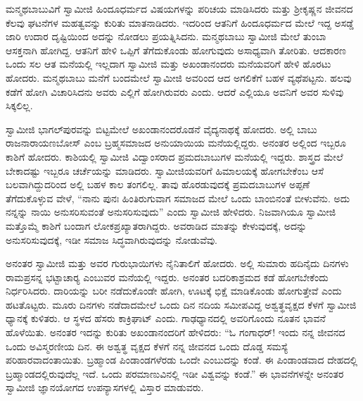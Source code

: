 ಮನ್ಮಥಬಾಬುವಿಗೆ ಸ್ವಾಮೀಜಿ ಹಿಂದೂಧರ್ಮದ ವಿಷಯಗಳನ್ನು ಪರಿಚಯ ಮಾಡಿಸಿದರು ಮತ್ತು ಶ‍್ರೀಕೃಷ್ಣನ ಜೀವನದ ಕೆಲವು ಘಟನೆಗಳ ಮಹತ್ವವನ್ನು ಕುರಿತು ಮಾತನಾಡಿದರು. ಇದರಿಂದ ಆತನಿಗೆ ಹಿಂದೂಧರ್ಮದ ಮೇಲೆ ಇದ್ದ ಅಸಡ್ಡೆ ಜಾರಿ ಉದಾರ ದೃಷ್ಟಿಯಿಂದ ಅದನ್ನು ನೋಡಲು ಪ್ರಯತ್ನಿಸಿದನು. ಮನ್ಮಥಬಾಬು ಸ್ವಾಮೀಜಿ ಮೇಲೆ ತುಂಬಾ ಆಸಕ್ತನಾಗಿ ಹೋಗಿದ್ದ. ಆತನಿಗೆ ಹೇಳಿ ಒಪ್ಪಿಗೆ ತೆಗೆದುಕೊಂಡು ಹೋಗುವುದು ಅಸಾಧ್ಯವಾಗಿ ತೋರಿತು. ಆದಕಾರಣ ಒಂದು ಸಲ ಆತ ಮನೆಯಲ್ಲಿ ಇಲ್ಲದಾಗ ಸ್ವಾಮೀಜಿ ಮತ್ತು ಅಖಂಡಾನಂದರು ಮನೆಯವರಿಗೆ ಹೇಳಿ ಹೊರಟು ಹೋದರು. ಮನ್ಮಥಬಾಬು ಮನೆಗೆ ಬಂದಮೇಲೆ ಸ್ವಾಮೀಜಿ ಅವರಿಂದ ಆದ ಅಗಲಿಕೆಗೆ ಬಹಳ ವ್ಯಥೆಪಟ್ಟನು. ಹಲವು ಕಡೆಗೆ ಹೋಗಿ ವಿಚಾರಿಸಿದನು ಅವರು ಎಲ್ಲಿಗೆ ಹೋಗಿರುವರು ಎಂದು. ಆದರೆ ಎಲ್ಲಿಯೂ ಅವನಿಗೆ ಅವರ ಸುಳಿವು ಸಿಕ್ಕಲಿಲ್ಲ. 

 ಸ್ವಾಮೀಜಿ ಭಾಗಲ್‍ಪುರವನ್ನು ಬಿಟ್ಟಮೇಲೆ ಅಖಂಡಾನಂದರೊಡನೆ ವೈದ್ಯನಾಥಕ್ಕೆ ಹೋದರು. ಅಲ್ಲಿ ಬಾಬು ರಾಜನಾರಾಯಣಬೋಸ್ ಎಂಬ ಬ್ರಹ್ಮಸಮಾಜದ ಅನುಯಾಯಿಯ ಮನೆಯಲ್ಲಿದ್ದರು. ಅನಂತರ ಅಲ್ಲಿಂದ ಇಬ್ಬರೂ ಕಾಶಿಗೆ ಹೋದರು. ಕಾಶಿಯಲ್ಲಿ ಸ್ವಾಮೀಜಿ ವಿದ್ವಾಂಸರಾದ ಪ್ರಮದಬಾಬುಗಳ ಮನೆಯಲ್ಲಿ ಇದ್ದರು. ಶಾಸ್ತ್ರದ ಮೇಲೆ ಬೇಕಾದಷ್ಟು ಇಬ್ಬರೂ ಚರ್ಚೆಯನ್ನು ಮಾಡಿದರು. ಸ್ವಾಮೀಜಿಯವರಿಗೆ ಹಿಮಾಲಯಕ್ಕೆ ಹೋಗಬೇಕೆಂಬ ಆಸೆ ಬಲವಾಗಿದ್ದುದರಿಂದ ಅಲ್ಲಿ ಬಹಳ ಕಾಲ ತಂಗಲಿಲ್ಲ. ತಾವು ಹೊರಡುವುದಕ್ಕೆ ಪ್ರಮದಬಾಬುಗಳ ಅಪ್ಪಣೆ ತೆಗೆದುಕೊಳ್ಳುವ ವೇಳೆ, “ನಾನು ಪುನಃ ಹಿಂತಿರುಗುವಾಗ ಸಮಾಜದ ಮೇಲೆ ಒಂದು ಬಾಂಬಿನಂತೆ ಬೀಳುವೆನು. ಅದು ನನ್ನನ್ನು ನಾಯಿ ಅನುಸರಿಸುವಂತೆ ಅನುಸರಿಸುವುದು” ಎಂದು ಸ್ವಾಮೀಜಿ ಹೇಳಿದರು. ನಿಜವಾಗಿಯೂ ಸ್ವಾಮೀಜಿ ಮತ್ತೊಮ್ಮೆ ಕಾಶಿಗೆ ಬಂದಾಗ ಲೋಕಪ್ರಖ್ಯಾತರಾಗಿದ್ದರು. ಅವರಾಡಿದ ಮಾತನ್ನು ಕೇಳುವುದಕ್ಕೆ, ಅದನ್ನು ಅನುಸರಿಸುವುದಕ್ಕೆ, ಇಡೀ ಸಮಾಜ ಸಿದ್ಧವಾಗಿರುವುದನ್ನು ನೋಡುವೆವು. 

ಅನಂತರ ಸ್ವಾಮೀಜಿ ಮತ್ತು ಅವರ ಗುರುಭಾಯಿಗಳು ನೈನಿತಾಲಿಗೆ ಹೋದರು. ಅಲ್ಲಿ ಸುಮಾರು ಹದಿನೈದು ದಿನಗಳು ರಾಮಪ್ರಸನ್ನ ಭಟ್ಟಾಚಾರ‍್ಯ ಎಂಬುವರ ಮನೆಯಲ್ಲಿ ಇದ್ದರು. ಅನಂತರ ಬದರಿಕಾಶ್ರಮದ ಕಡೆ ಹೋಗಬೇಕೆಂದು ನಿರ್ಧರಿಸಿದರು. ದಾರಿಯನ್ನು ಬರೀ ನಡೆದುಕೊಂಡೇ ಹೋಗಿ, ಊಟಕ್ಕೆ ಭಿಕ್ಷೆ ಮಾಡಿಕೊಂಡು ಹೋಗುತ್ತೇವೆ ಎಂದು ಹಟತೊಟ್ಟರು. ಮೂರು ದಿನಗಳು ನಡೆದಾದಮೇಲೆ ಒಂದು ದಿನ ನದಿಯ ಸಮೀಪವಿದ್ದ ಅಶ್ವತ್ಥವೃಕ್ಷದ ಕೆಳಗೆ ಸ್ವಾಮೀಜಿ ಧ್ಯಾನಕ್ಕೆ ಕುಳಿತರು. ಆ ಸ್ಥಳದ ಹೆಸರು ಕಾಕ್ರಿಘಾಟ್ ಎಂದು. ಗಾಢಧ್ಯಾನದಲ್ಲಿ ಅವರಿಗೊಂದು ನೂತನ ಭಾವನೆ ಹೊಳೆಯಿತು. ಅನಂತರ ಇದನ್ನು ಕುರಿತು ಅಖಂಡಾನಂದರಿಗೆ ಹೇಳಿದರು: “ಓ ಗಂಗಾಧರ್! ಇಂದು ನನ್ನ ಜೀವನದ ಒಂದು ಅವಿಸ್ಮರಣೀಯ ದಿನ. ಈ ಅಶ್ವತ್ಥ ವೃಕ್ಷದ ಕೆಳಗೆ ನನ್ನ ಜೀವನದ ಒಂದು ದೊಡ್ಡ ಸಮಸ್ಯೆ ಪರಿಹಾರವಾದಂತಾಯಿತು. ಬ್ರಹ್ಮಾಂಡ ಪಿಂಡಾಂಡಗಳೆರಡು ಒಂದೇ ಎಂಬುದನ್ನು ಕಂಡೆ. ಈ ಪಿಂಡಾಂಡವಾದ ದೇಹದಲ್ಲಿ ಬ್ರಹ್ಮಾಂಡದಲ್ಲಿರುವುದೆಲ್ಲ ಇದೆ. ಒಂದು ಪರಮಾಣುವಿನಲ್ಲಿ ಇಡೀ ವಿಶ್ವವನ್ನು ಕಂಡೆ.” ಈ ಭಾವನೆಗಳನ್ನೇ ಅನಂತರ ಸ್ವಾಮೀಜಿ ಜ್ಞಾನಯೋಗದ ಉಪನ್ಯಾಸಗಳಲ್ಲಿ ವಿಸ್ತಾರ ಮಾಡುವರು. 

